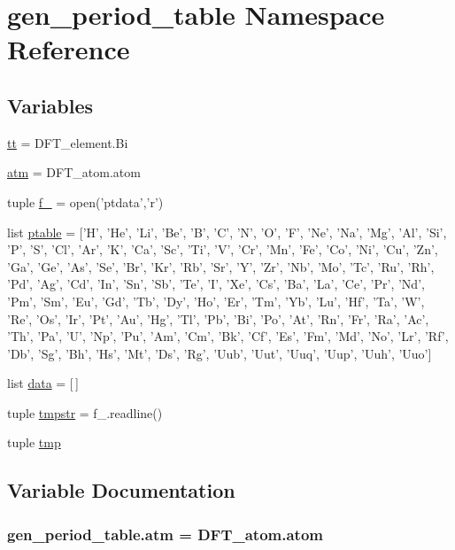 \hypertarget{namespacegen__period__table}{\section{gen\+\_\+period\+\_\+table Namespace Reference}
\label{namespacegen__period__table}
}
\subsection*{Variables}
\begin{DoxyCompactItemize}
\item 
\hyperlink{namespacegen__period__table_a92f4e05a0c7536c4fb08ffffc227dc86}{tt} = D\+F\+T\+\_\+element.\+Bi
\item 
\hyperlink{namespacegen__period__table_abb07689feb7c098214acc420cd2d3bbf}{atm} = D\+F\+T\+\_\+atom.\+atom
\item 
tuple \hyperlink{namespacegen__period__table_ac1b050e937df5a51b9ffb47de6287d6b}{f\+\_\+} = open('ptdata','r')
\item 
list \hyperlink{namespacegen__period__table_affcfd8286c3b181d6632fcd6a69c2a41}{ptable} = \mbox{[}'H', 'He', 'Li', 'Be', 'B', 'C', 'N', 'O', 'F', 'Ne', 'Na', 'Mg', 'Al', 'Si', 'P', 'S', 'Cl', 'Ar', 'K', 'Ca', 'Sc', 'Ti', 'V', 'Cr', 'Mn', 'Fe', 'Co', 'Ni', 'Cu', 'Zn', 'Ga', 'Ge', 'As', 'Se', 'Br', 'Kr', 'Rb', 'Sr', 'Y', 'Zr', 'Nb', 'Mo', 'Tc', 'Ru', 'Rh', 'Pd', 'Ag', 'Cd', 'In', 'Sn', 'Sb', 'Te', 'I', 'Xe', 'Cs', 'Ba', 'La', 'Ce', 'Pr', 'Nd', 'Pm', 'Sm', 'Eu', 'Gd', 'Tb', 'Dy', 'Ho', 'Er', 'Tm', 'Yb', 'Lu', 'Hf', 'Ta', 'W', 'Re', 'Os', 'Ir', 'Pt', 'Au', 'Hg', 'Tl', 'Pb', 'Bi', 'Po', 'At', 'Rn', 'Fr', 'Ra', 'Ac', 'Th', 'Pa', 'U', 'Np', 'Pu', 'Am', 'Cm', 'Bk', 'Cf', 'Es', 'Fm', 'Md', 'No', 'Lr', 'Rf', 'Db', 'Sg', 'Bh', 'Hs', 'Mt', 'Ds', 'Rg', 'Uub', 'Uut', 'Uuq', 'Uup', 'Uuh', 'Uuo'\mbox{]}
\item 
list \hyperlink{namespacegen__period__table_aa362c3231b0e20bb880ab0ccd81a97eb}{data} = \mbox{[}$\,$\mbox{]}
\item 
tuple \hyperlink{namespacegen__period__table_ab86a6d8ecb978ca7313bcc61f8789d5e}{tmpstr} = f\+\_\+.\+readline()
\item 
tuple \hyperlink{namespacegen__period__table_ad3db3c645f8d69689e48ee4bc93fc478}{tmp}
\end{DoxyCompactItemize}


\subsection{Variable Documentation}
\hypertarget{namespacegen__period__table_abb07689feb7c098214acc420cd2d3bbf}{
\subsubsection[{atm}]{\setlength{\rightskip}{0pt plus 5cm}gen\+\_\+period\+\_\+table.\+atm = D\+F\+T\+\_\+atom.\+atom}}\label{namespacegen__period__table_abb07689feb7c098214acc420cd2d3bbf}


